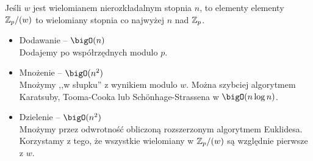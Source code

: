 Jeśli \( w \) jest wielomianem nierozkładalnym stopnia \( n \), to elementy 
elementy \( \mathbb{Z}_p/(w) \) to wielomiany stopnia co najwyżej \( n \) nad \( \mathbb{Z}_p \).
\begin{itemize}
    \item Dodawanie -- \( \bigO(n) \) \\
    Dodajemy po współrzędnych modulo \( p \).
    \item Mnożenie -- \( \bigO(n^2) \) \\
    Mnożymy ,,w słupku'' z wynikiem modulo \( w \). Można szybciej algorytmem Karatsuby, Tooma-Cooka lub Sch\"onhage-Strassena w \( \bigO(n\log n) \).
    \item Dzielenie -- \( \bigO(n^2) \) \\
    Mnożymy przez odwrotność obliczoną rozszerzonym algorytmem Euklidesa. Korzystamy z tego, że wszystkie wielomiany w \( \mathbb{Z}_p/(w) \) są względnie pierwsze z \( w \).
\end{itemize}
